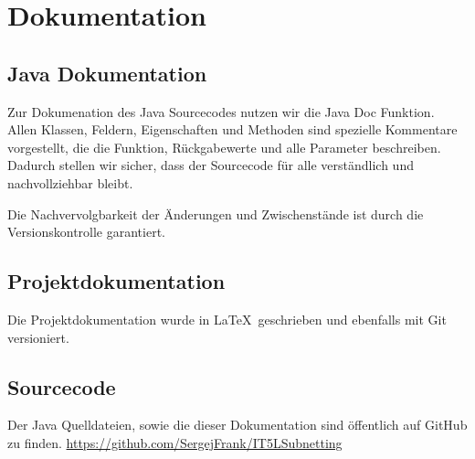 \section{Dokumentation}

\subsection{Java Dokumentation}
Zur Dokumenation des Java Sourcecodes nutzen wir die Java Doc Funktion. Allen Klassen, Feldern,
Eigenschaften und Methoden sind spezielle Kommentare vorgestellt, die die Funktion, Rückgabewerte
und alle Parameter beschreiben. Dadurch stellen wir sicher, dass der Sourcecode für alle verständlich
und nachvollziehbar bleibt.

Die Nachvervolgbarkeit der Änderungen und Zwischenstände ist durch die Versionskontrolle garantiert.

\subsection{Projektdokumentation}
Die Projektdokumentation wurde in \LaTeX\  geschrieben und ebenfalls mit Git versioniert. 

\subsection{Sourcecode}
Der Java Quelldateien, sowie die dieser Dokumentation sind öffentlich auf GitHub zu finden.
\url{https://github.com/SergejFrank/IT5LSubnetting}